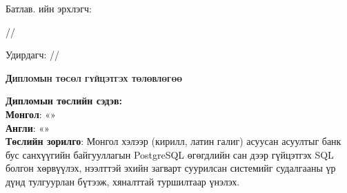 
\begin{titlepage}
\small
\noindent Батлав. \deptname ийн эрхлэгч:
\begin{flushright}
\makebox[6cm]{\dotfill} /\chairname/
\end{flushright}
Удирдагч:\makebox[6cm]{ \dotfill} /\supname/
\begin{center}
\vspace*{0.5cm}
\textbf{{\large \textsc{Дипломын төсөл гүйцэтгэх төлөвлөгөө}}}\\[0.5cm]
\end{center}
\noindent \textbf{Дипломын төслийн сэдэв:}\\
\textbf{Монгол}: «\ttitle» \\
\textbf{Англи}: «\ttitleng»\\

\noindent \textbf{Төслийн зорилго}: Монгол хэлээр (кирилл, латин галиг) асуусан асуултыг банк бус санхүүгийн байгууллагын
PostgreSQL өгөгдлийн сан дээр гүйцэтгэх SQL болгон хөрвүүлэх, нээлттэй эхийн загварт суурилсан системийг судалгааны
үр дүнд тулгуурлан бүтээж, хяналттай туршилтаар үнэлэх.\\


\end{titlepage}
